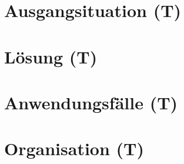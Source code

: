 \section{Ausgangsituation (T)}


\section{Lösung (T)}


\section{Anwendungsfälle (T)}


\section{Organisation (T)}
